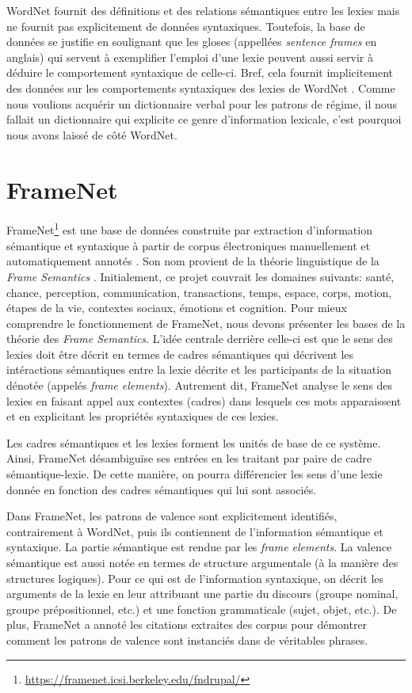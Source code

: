 WordNet fournit des définitions et des relations sémantiques entre les lexies mais ne fournit pas explicitement de données syntaxiques. Toutefois, la base de données se justifie en soulignant que les gloses (appellées \emph{sentence frames} en anglais) qui servent à exemplifier l'emploi d'une lexie peuvent aussi servir à déduire le comportement syntaxique de celle-ci. Bref, cela fournit implicitement des données sur les comportements syntaxiques des lexies de WordNet \citep{FellbaumLargescaleLexicographyDigital2014}. Comme nous voulions acquérir un dictionnaire verbal pour les patrons de régime, il nous fallait un dictionnaire qui explicite ce genre d'information lexicale, c'est pourquoi nous avons laissé de côté WordNet.

\section{FrameNet}
FrameNet\footnote{\url{https://framenet.icsi.berkeley.edu/fndrupal/}} est une base de données construite par extraction d'information sémantique et syntaxique à partir de corpus électroniques manuellement et automatiquement annotés \citep{FillmoreBackgroundFramenet2003a}. Son nom provient de la théorie linguistique de la \emph{Frame Semantics} \citep{BakerBerkeleyFrameNetProject1998}. Initialement, ce projet couvrait les domaines suivants: santé, chance, perception, communication, transactions, temps, espace, corps, motion, étapes de la vie, contextes sociaux, émotions et cognition. Pour mieux comprendre le fonctionnement de FrameNet, nous devons présenter les bases de la théorie des \emph{Frame Semantics}. L'idée centrale derrière celle-ci est que le sens des lexies doit être décrit en termes de cadres sémantiques qui décrivent les intéractions sémantiques entre la lexie décrite et les participants de la situation dénotée (appelés \emph{frame elements}). Autrement dit, FrameNet analyse le sens des lexies en faisant appel aux contextes (cadres) dans lesquels ces mots apparaissent et en explicitant les propriétés syntaxiques de ces lexies.

Les cadres sémantiques et les lexies forment les unités de base de ce système. Ainsi, FrameNet désambiguïse ses entrées en les traitant par paire de cadre sémantique-lexie. De cette manière, on pourra différencier les sens d'une lexie donnée en fonction des cadres sémantiques qui lui sont associés.

Dans FrameNet, les patrons de valence sont explicitement identifiés, contrairement à WordNet, puis ils contiennent de l'information sémantique et syntaxique. La partie sémantique est rendue par les \emph{frame elements}. La valence sémantique est aussi notée en termes de structure argumentale (à la manière des structures logiques). Pour ce qui est de l'information syntaxique, on décrit les arguments de la lexie en leur attribuant une partie du discours (groupe nominal, groupe prépositionnel, etc.) et une fonction grammaticale (sujet, objet, etc.). De plus, FrameNet a annoté les citations extraites des corpus pour démontrer comment les patrons de valence sont instanciés dans de véritables phrases.

